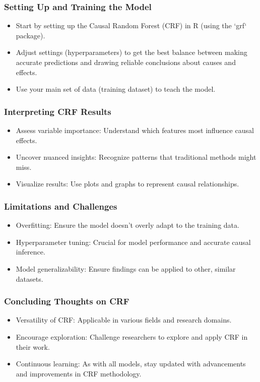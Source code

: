 \documentclass{beamer}
\begin{document}
\begin{frame}
\frametitle{Setting Up and Training the Model}
\begin{itemize}
    \item Start by setting up the Causal Random Forest (CRF) in R (using the `grf` package).
    \item Adjust settings (hyperparameters) to get the best balance between making accurate predictions and drawing reliable conclusions about causes and effects.
    \item Use your main set of data (training dataset) to teach the model.
\end{itemize}
\end{frame}

\begin{frame}
\frametitle{Interpreting CRF Results}
\begin{itemize}
    \item Assess variable importance: Understand which features most influence causal effects.
    \item Uncover nuanced insights: Recognize patterns that traditional methods might miss.
    \item Visualize results: Use plots and graphs to represent causal relationships.
\end{itemize}
\end{frame}

\begin{frame}
\frametitle{Limitations and Challenges}
\begin{itemize}
    \item Overfitting: Ensure the model doesn't overly adapt to the training data.
    \item Hyperparameter tuning: Crucial for model performance and accurate causal inference.
    \item Model generalizability: Ensure findings can be applied to other, similar datasets.
\end{itemize}
\end{frame}

\begin{frame}
\frametitle{Concluding Thoughts on CRF}
\begin{itemize}
    \item Versatility of CRF: Applicable in various fields and research domains.
    \item Encourage exploration: Challenge researchers to explore and apply CRF in their work.
    \item Continuous learning: As with all models, stay updated with advancements and improvements in CRF methodology.
\end{itemize}
\end{frame}
\end{document}
